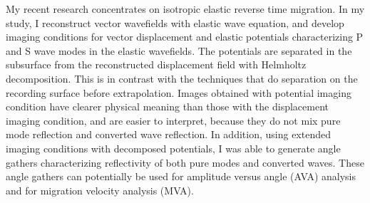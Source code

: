 
My recent research concentrates on isotropic elastic reverse time migration. In my study, I reconstruct vector wavefields with elastic wave equation, and develop imaging conditions for vector displacement and elastic potentials characterizing P and S wave modes in the elastic wavefields. The potentials are separated in the subsurface from the reconstructed displacement field with Helmholtz decomposition. This is in contrast with the techniques that do separation on the recording surface before extrapolation. Images obtained with potential imaging condition have clearer physical meaning than those with the displacement imaging condition, and are easier to interpret, because they do not mix pure mode reflection and converted wave reflection. In addition, using extended imaging conditions with decomposed potentials, I was able to generate angle gathers characterizing reflectivity of both pure modes and converted waves. These angle gathers can potentially be used for amplitude versus angle (AVA) analysis and for migration velocity analysis (MVA).

